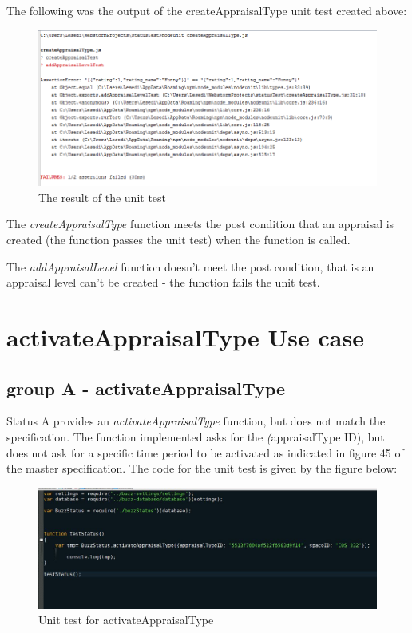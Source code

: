 \documentclass[a4paper,12pt]{article}
\begin{document}
The following was the output of the createAppraisalType unit test created above:
\begin{figure}[H]
		\centering
		\includegraphics[width=1.0\textwidth]{Figures/createAppraisalTypeUnitTestsResult.png}
		\caption{The result of the unit test}
	\end{figure}
	
The \textit{createAppraisalType} function meets the post condition that an appraisal is created (the function passes the unit test) when the function is called.

The \textit{addAppraisalLevel} function doesn't meet the post condition, that is an appraisal level can't be created - the function fails the unit test.

\newpage
\section{activateAppraisalType Use case}
\subsection{group A - activateAppraisalType}

Status A provides an \textit{activateAppraisalType} function, but does not match the specification. The function implemented asks for the \textit(appraisalType ID), but does not ask for a specific time period to be activated as indicated in figure 45 of the master specification. The code for the unit test is given by the figure below:


	\begin{figure}[H]
		\centering
		\includegraphics[width=1.0\textwidth]{Figures/activateTypeAtestcode.JPG}
		\caption{Unit test for activateAppraisalType}
	\end{figure}
\end{document}
